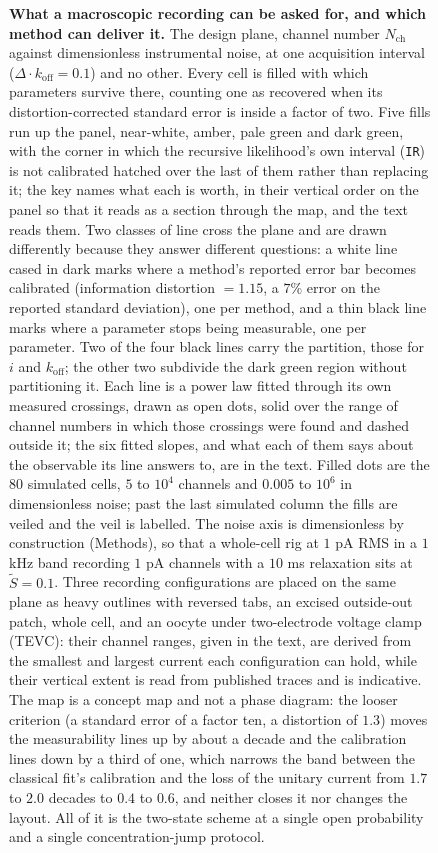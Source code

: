 \begin{figure}[htbp]
\begin{fullwidth}
\caption{\textbf{What a macroscopic recording can be asked for, and which method can deliver it.} The design plane, channel number $N_{\mathrm{ch}}$ against dimensionless instrumental noise, at one acquisition interval ($\Delta\!\cdot\!k_{\mathrm{off}}=0.1$) and no other. Every cell is filled with which parameters survive there, counting one as recovered when its distortion-corrected standard error is inside a factor of two. Five fills run up the panel, near-white, amber, pale green and dark green, with the corner in which the recursive likelihood's own interval (\texttt{IR}) is not calibrated hatched over the last of them rather than replacing it; the key names what each is worth, in their vertical order on the panel so that it reads as a section through the map, and the text reads them. Two classes of line cross the plane and are drawn differently because they answer different questions: a white line cased in dark marks where a method's reported error bar becomes calibrated (information distortion $=1.15$, a $7\%$ error on the reported standard deviation), one per method, and a thin black line marks where a parameter stops being measurable, one per parameter. Two of the four black lines carry the partition, those for $i$ and $k_{\mathrm{off}}$; the other two subdivide the dark green region without partitioning it. Each line is a power law fitted through its own measured crossings, drawn as open dots, solid over the range of channel numbers in which those crossings were found and dashed outside it; the six fitted slopes, and what each of them says about the observable its line answers to, are in the text. Filled dots are the $80$ simulated cells, $5$ to $10^4$ channels and $0.005$ to $10^6$ in dimensionless noise; past the last simulated column the fills are veiled and the veil is labelled. The noise axis is dimensionless by construction (Methods), so that a whole-cell rig at $1$ pA RMS in a $1$ kHz band recording $1$ pA channels with a $10$ ms relaxation sits at $\widetilde{S} = 0.1$. Three recording configurations are placed on the same plane as heavy outlines with reversed tabs, an excised outside-out patch, whole cell, and an oocyte under two-electrode voltage clamp (TEVC): their channel ranges, given in the text, are derived from the smallest and largest current each configuration can hold, while their vertical extent is read from published traces and is indicative. The map is a concept map and not a phase diagram: the looser criterion (a standard error of a factor ten, a distortion of $1.3$) moves the measurability lines up by about a decade and the calibration lines down by a third of one, which narrows the band between the classical fit's calibration and the loss of the unitary current from $1.7$ to $2.0$ decades to $0.4$ to $0.6$, and neither closes it nor changes the layout. All of it is the two-state scheme at a single open probability and a single concentration-jump protocol.}

\end{fullwidth}
\end{figure}

